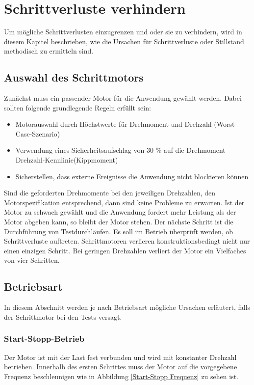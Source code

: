 \section{Schrittverluste verhindern}
Um mögliche Schrittverlusten einzugrenzen und oder sie zu verhindern, wird in diesem Kapitel beschrieben, wie die Ursachen für Schrittverluste oder Stillstand methodisch zu ermitteln sind. \cite{Faulhaber:2020}

\subsection{Auswahl des Schrittmotors}
Zunächst muss ein passender Motor für die Anwendung gewählt werden. Dabei sollten folgende grundlegende Regeln erfüllt sein:
\begin{itemize}
	\item Motorauswahl durch Höchstwerte für Drehmoment und Drehzahl (Worst-Case-Szenario)
	\item Verwendung eines Sicherheitsaufschlag von 30 \% auf die Drehmoment-Drehzahl-Kennlinie(Kippmoment)
	\item Sicherstellen, dass externe Ereignisse die Anwendung nicht blockieren können
\end{itemize}

Sind die geforderten Drehmomente bei den jeweiligen Drehzahlen, den Motorspezifikation entsprechend, dann sind keine Probleme zu erwarten. Ist der Motor zu schwach gewählt und die Anwendung fordert mehr Leistung als der Motor abgeben kann, so bleibt der Motor stehen. Der nächste Schritt ist die Durchführung von Testdurchläufen. Es soll im Betrieb überprüft werden, ob Schrittverluste auftreten. Schrittmotoren verlieren konstruktionsbedingt nicht nur einen einzigen Schritt. Bei geringen Drehzahlen verliert der Motor ein Vielfaches von vier Schritten.\cite{Faulhaber:2020}


\subsection{Betriebsart}

In diesem Abschnitt werden je nach Betriebsart mögliche Ursachen erläutert, falls der Schrittmotor bei den Tests versagt.

\subsubsection{Start-Stopp-Betrieb}

Der Motor ist mit der Last fest verbunden und wird mit konstanter Drehzahl betrieben. Innerhalb des ersten Schrittes muss der Motor auf die vorgegebene Frequenz beschleunigen wie in Abbildung \ref{Start-Stopp Frequenz} zu sehen ist.\cite{Faulhaber:2020} 

